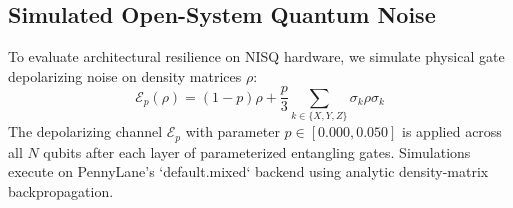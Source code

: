 \subsection{Simulated Open-System Quantum Noise}
To evaluate architectural resilience on NISQ hardware, we simulate physical gate depolarizing noise on density matrices $\rho$:
\begin{equation}
    \mathcal{E}_p(\rho) = (1 - p)\rho + \frac{p}{3} \sum_{k \in \{X, Y, Z\}} \sigma_k \rho \sigma_k
\end{equation}
The depolarizing channel $\mathcal{E}_p$ with parameter $p \in [0.000, 0.050]$ is applied across all $N$ qubits after each layer of parameterized entangling gates. 
Simulations execute on PennyLane's `default.mixed` backend using analytic density-matrix backpropagation.
